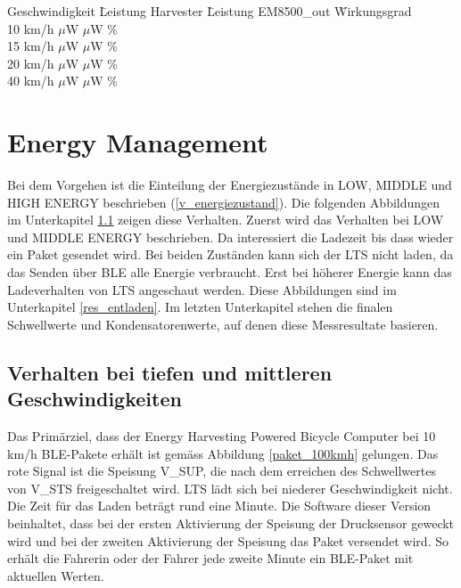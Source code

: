 \begin{minipage}{\textwidth}
    \begin{tabbing}
    \label{wirkungsgrad_emchip}
        Geschwindigkeit \quad\= Leistung Harvester \quad\= Leistung EM8500\_out \quad\= Wirkungsgrad\\[0.8ex]
        10 km/h    $\mu$W    $\mu$W \thinspace\%  \\
        15 km/h    $\mu$W   $\mu$W \thinspace\%  \\
        20 km/h  $\mu$W   $\mu$W \thinspace\%  \\
        40 km/h  $\mu$W  $\mu$W \thinspace\%  \\
    \end{tabbing}
\end{minipage}  


\section{Energy Management}

Bei dem Vorgehen ist die Einteilung der Energiezustände in LOW, MIDDLE und HIGH ENERGY beschrieben (\ref{v_energiezustand}). Die folgenden Abbildungen im Unterkapitel \ref{tiefes_v} zeigen diese Verhalten. Zuerst wird das Verhalten bei LOW und MIDDLE ENERGY beschrieben. Da interessiert die Ladezeit bis dass wieder ein Paket gesendet wird. Bei beiden Zuständen kann sich der LTS nicht laden, da das Senden über BLE alle Energie verbraucht. Erst bei höherer Energie kann das Ladeverhalten von LTS angeschaut werden. Diese Abbildungen sind im Unterkapitel \ref{res_entladen}. Im letzten Unterkapitel stehen die finalen Schwellwerte und Kondensatorenwerte, auf denen diese Messresultate basieren.

\subsection{Verhalten bei tiefen und mittleren Geschwindigkeiten}
\label{tiefes_v}


Das Primärziel, dass der Energy Harvesting Powered Bicycle Computer bei 10 km/h BLE-Pakete erhält ist gemäss Abbildung \ref{paket_100kmh} gelungen. Das rote Signal ist die Speisung V\_SUP, die nach dem erreichen des Schwellwertes von V\_STS freigeschaltet wird. LTS lädt sich bei niederer Geschwindigkeit nicht. Die Zeit für das Laden beträgt rund eine Minute. Die Software dieser Version beinhaltet, dass bei der ersten Aktivierung der Speisung der Drucksensor geweckt wird  und bei der zweiten Aktivierung der Speisung das Paket versendet wird. So erhält die Fahrerin oder der Fahrer jede zweite Minute ein BLE-Paket mit aktuellen Werten.

